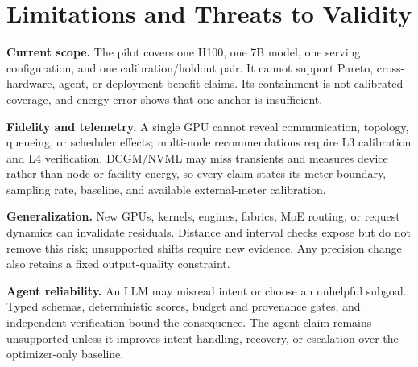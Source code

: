 \section{Limitations and Threats to Validity}

\textbf{Current scope.}  The pilot covers one H100, one 7B model, one serving
configuration, and one calibration/holdout pair.  It cannot support Pareto,
cross-hardware, agent, or deployment-benefit claims.  Its \PilotCoverage{}
containment is not calibrated coverage, and \PilotEnergyAPE{} energy error
shows that one anchor is insufficient.

\textbf{Fidelity and telemetry.}  A single GPU cannot reveal communication,
topology, queueing, or scheduler effects; multi-node recommendations require L3
calibration and L4 verification.  DCGM/NVML may miss transients and measures
device rather than node or facility energy, so every claim states its meter
boundary, sampling rate, baseline, and available external-meter calibration.

\textbf{Generalization.}  New GPUs, kernels, engines, fabrics, MoE routing, or
request dynamics can invalidate residuals.  Distance and interval checks expose
but do not remove this risk; unsupported shifts require new evidence.  Any
precision change also retains a fixed output-quality constraint.

\textbf{Agent reliability.}  An LLM may misread intent or choose an unhelpful
subgoal.  Typed schemas, deterministic scores, budget and provenance gates, and
independent verification bound the consequence.  The agent claim remains
unsupported unless it improves intent handling, recovery, or escalation over
the optimizer-only baseline.
